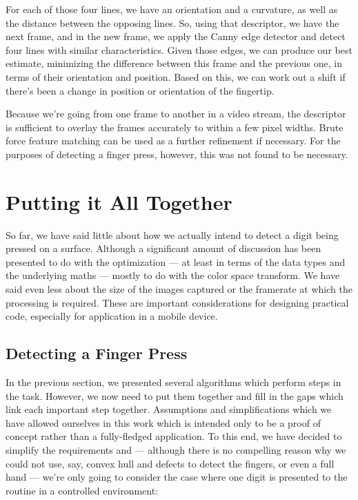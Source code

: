 For each of those four lines, we have an orientation and a curvature, as well as the distance between the opposing lines. So, using that descriptor, we have the next frame, and in the new frame, we apply the Canny edge detector and detect four lines with similar characteristics. Given those edges, we can produce our best estimate, minimizing the difference between this frame and the previous one, in terms of their orientation and position. Based on this, we can work out a shift if there's been a change in position or orientation of the fingertip.

Because we're going from one frame to another in a video stream, the descriptor is sufficient to overlay the frames accurately to within a few pixel widths. Brute force feature matching can be used as a further refinement if necessary. For the purposes of detecting a finger press, however, this was not found to be necessary.

\section{Putting it All Together}\label{sec:PuttingItAllTogether}

So far, we have said little about how we actually intend to detect a digit being pressed on a surface. Although a significant amount of discussion has been presented to do with the optimization --- at least in terms of the data types and the underlying maths --- mostly to do with the color space transform. We have said even less about the size of the images captured or the framerate at which the processing is required. These are important considerations for designing practical code, especially for application in a mobile device.

\subsection{Detecting a Finger Press}\label{sec:DetectingAFingerPress}

In the previous section, we presented several algorithms which perform steps in the task. However, we now need to put them together and fill in the gaps which link each important step together. Assumptions and simplifications which we have allowed ourselves in this work which is intended only to be a proof of concept rather than a fully-fledged application. To this end, we have decided to simplify the requirements and --- although there is no compelling reason why we could not use, say, convex hull and defects to detect the fingers, or even a full hand --- we're only going to consider the case where one digit is presented to the routine in a controlled environment:

